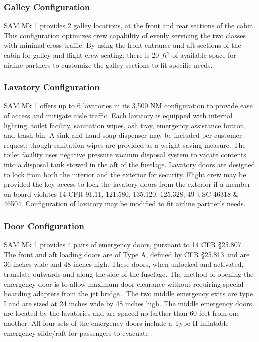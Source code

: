 \subsubsection{Galley Configuration}
SAM Mk 1 provides 2 galley locations, at the front and rear sections of the cabin.  This configuration optimizes crew capability of evenly servicing the two classes with minimal cross traffic.  By using the front entrance and aft sections of the cabin for galley and flight crew seating, there is 20 $ft^2$ of available space for airline partners to customize the galley sections to fit specific needs.

\subsubsection{Lavatory Configuration}
SAM Mk 1 offers up to 6 lavatories in its 3,500 NM configuration to provide ease of access and mitigate aisle traffic.  Each lavatory is equipped with internal lighting, toilet facility, sanitation wipes, ash tray, emergency assistance button, and trash bin.  A sink and hand soap dispenser may be included per customer request; though sanitation wipes are provided as a weight saving measure.  The toilet facility uses negative pressure vacuum disposal system to vacate contents into a disposal tank stowed in the aft of the fuselage.\cite{toilet}  Lavatory doors are designed to lock from both the interior and the exterior for security.  Flight crew may be provided the key access to lock the lavatory doors from the exterior if a member on-board violates 14 CFR 91.11, 121.580, 135.120, 125.328, 49 USC 46318 \& 46504.  Configuration of lavatory may be modified to fit airline partner's needs.

\subsubsection{Door Configuration}
SAM Mk 1 provides 4 pairs of emergency doors, pursuant to 14 CFR \S25.807.  The front and aft loading doors are of Type A, defined by CFR \S25.813 and are 36 inches wide and 48 inches high.  These doors, when unlocked and activated, translate outwards and along the side of the fuselage.  The method of opening the emergency door is to allow maximum door clearance without requiring special boarding adapters from the jet bridge \cite{cfr}.  The two middle emergency exits are type I and are sized at 24 inches wide by 48 inches high.  The middle emergency doors are located by the lavatories and are spaced no farther than 60 feet from one another.  All four sets of the emergency doors include a Type II inflatable emergency slide/raft for passengers to evacuate \cite{slides}.

